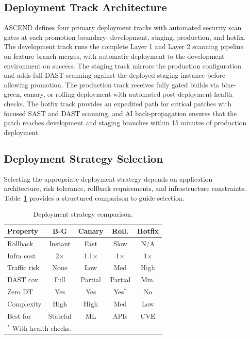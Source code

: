\documentclass{ieeeaccess}
\begin{document}
\subsection{Deployment Track Architecture}
ASCEND defines four primary deployment tracks with automated security scan gates at each promotion boundary: development, staging, production, and hotfix. The development track runs the complete Layer 1 and Layer 2 scanning pipeline on feature branch merges, with automatic deployment to the development environment on success. The staging track mirrors the production configuration and adds full DAST scanning against the deployed staging instance before allowing promotion. The production track receives fully gated builds via blue-green, canary, or rolling deployment with automated post-deployment health checks. The hotfix track provides an expedited path for critical patches with focused SAST and DAST scanning, and AI back-propagation ensures that the patch reaches development and staging branches within 15 minutes of production deployment.

\subsection{Deployment Strategy Selection}
Selecting the appropriate deployment strategy depends on application architecture, risk tolerance, rollback requirements, and infrastructure constraints. Table~\ref{tab:strategy} provides a structured comparison to guide selection.

\begin{table}[!t]
\caption{Deployment strategy comparison.}
\label{tab:strategy}
\centering
\begin{tabular}{lcccc}
\hline
\textbf{Property} & \textbf{B-G} & \textbf{Canary} & \textbf{Roll.} & \textbf{Hotfix} \\
\hline
Rollback     & Instant   & Fast & Slow & N/A   \\
Infra cost   & 2$\times$ & 1.1$\times$ & 1$\times$ & 1$\times$ \\
Traffic risk & None      & Low  & Med  & High  \\
DAST cov.    & Full      & Partial & Partial & Min. \\
Zero DT      & Yes       & Yes  & Yes$^{*}$ & No \\
Complexity   & High      & High & Med  & Low \\
Best for     & Stateful  & ML   & APIs & CVE \\
\hline
\multicolumn{5}{l}{\footnotesize $^{*}$ With health checks.}
\end{tabular}
\end{table}
\end{document}
